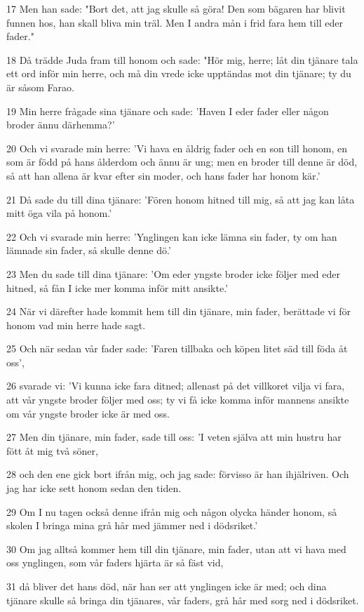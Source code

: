 \par 17 Men han sade: "Bort det, att jag skulle så göra! Den som bägaren har blivit funnen hos, han skall bliva min träl. Men I andra mån i frid fara hem till eder fader."
\par 18 Då trädde Juda fram till honom och sade: "Hör mig, herre; låt din tjänare tala ett ord inför min herre, och må din vrede icke upptändas mot din tjänare; ty du är såsom Farao.
\par 19 Min herre frågade sina tjänare och sade: 'Haven I eder fader eller någon broder ännu därhemma?'
\par 20 Och vi svarade min herre: 'Vi hava en åldrig fader och en son till honom, en som är född på hans ålderdom och ännu är ung; men en broder till denne är död, så att han allena är kvar efter sin moder, och hans fader har honom kär.'
\par 21 Då sade du till dina tjänare: 'Fören honom hitned till mig, så att jag kan låta mitt öga vila på honom.'
\par 22 Och vi svarade min herre: 'Ynglingen kan icke lämna sin fader, ty om han lämnade sin fader, så skulle denne dö.'
\par 23 Men du sade till dina tjänare: 'Om eder yngste broder icke följer med eder hitned, så fån I icke mer komma inför mitt ansikte.'
\par 24 När vi därefter hade kommit hem till din tjänare, min fader, berättade vi för honom vad min herre hade sagt.
\par 25 Och när sedan vår fader sade: 'Faren tillbaka och köpen litet säd till föda åt oss',
\par 26 svarade vi: 'Vi kunna icke fara ditned; allenast på det villkoret vilja vi fara, att vår yngste broder följer med oss; ty vi få icke komma inför mannens ansikte om vår yngste broder icke är med oss.
\par 27 Men din tjänare, min fader, sade till oss: 'I veten själva att min hustru har fött åt mig två söner,
\par 28 och den ene gick bort ifrån mig, och jag sade: förvisso är han ihjälriven. Och jag har icke sett honom sedan den tiden.
\par 29 Om I nu tagen också denne ifrån mig och någon olycka händer honom, så skolen I bringa mina grå hår med jämmer ned i dödsriket.'
\par 30 Om jag alltså kommer hem till din tjänare, min fader, utan att vi hava med oss ynglingen, som vår faders hjärta är så fäst vid,
\par 31 då bliver det hans död, när han ser att ynglingen icke är med; och dina tjänare skulle så bringa din tjänares, vår faders, grå hår med sorg ned i dödsriket.

